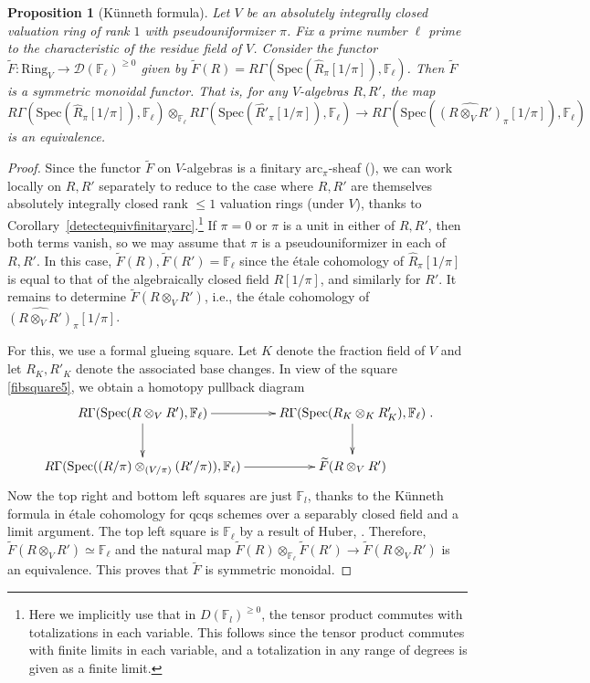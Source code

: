 \documentclass[reqno]{amsart}
\newcommand{\spec}{\mathrm{Spec}}
\newcommand{\arc}{\mathrm{arc}}
\newcommand{\D}{\mathcal{D}}
\newtheorem{proposition}[theorem]{Proposition}
\theoremstyle{definition}
\begin{document}
\begin{proposition}[K\"unneth formula] 
\label{kunnethformula}
Let $V$ be an absolutely integrally closed valuation ring of rank $1$ with
pseudouniformizer $\pi$. Fix a prime number $\ell$ prime to the characteristic of
the residue field of $V$. Consider the functor $\widetilde{F}\colon 
\mathrm{Ring}_V \to \D( \mathbb{F}_\ell)^{\geq 0}$ given by $\widetilde{F}(R) = R
\Gamma( \spec( \hat{R}_\pi[1/\pi]), \mathbb{F}_\ell)$. 
Then $\widetilde{F}$ is a symmetric monoidal functor. That is, for any
$V$-algebras $R, R'$, the map
\[  R
\Gamma( \spec( \hat{R}_\pi[1/\pi]), \mathbb{F}_\ell) 
\otimes_{\mathbb{F}_\ell} R
\Gamma( \spec( \widehat{R'}_\pi[1/\pi]), \mathbb{F}_\ell)
\to 
R \Gamma( \spec( \widehat{(R\otimes_V R')}_\pi[1/\pi]), \mathbb{F}_\ell) 
\]
is an equivalence. 
\end{proposition} 
\begin{proof} 
Since the functor $\widetilde{F}$ on $V$-algebras is a finitary
$\arc_\pi$-sheaf (), 
we can work locally on $R, R'$ separately to reduce to the case where $R,
R'$ are themselves absolutely integrally closed rank $\leq 1$ valuation rings
(under $V$), thanks to Corollary~\ref{detectequivfinitaryarc}.\footnote{Here we
implicitly use that in $D(\mathbb{F}_l)^{\geq 0}$, the tensor product commutes
with totalizations in each variable. This follows since the tensor product
commutes with finite limits in each variable, and a totalization in any range
of degrees is given as a finite limit.} 
If $\pi = 0$ or $\pi$ is a unit in either of $R, R'$, then both terms vanish, so we may assume that $\pi$ is a pseudouniformizer in
each of $R, R'$. 
In this case, $\widetilde{F}(R), \widetilde{F}(R') = \mathbb{F}_\ell$ since the
\'etale cohomology of $\hat{R}_\pi[1/\pi]$ is equal to that of the
algebraically closed field $R[1/\pi]$, and similarly for $R'$. 
It remains to determine $\widetilde{F}( R \otimes_V R')$, i.e., the \'etale cohomology of 
$\widehat{(R\otimes_V R')}_\pi[1/\pi]$. 


For this, we use a formal glueing square. Let $K$ denote the fraction field
of $V$ and let $R_K, R'_K$ denote the associated base changes.  
In view of the square \eqref{fibsquare5}, we obtain a homotopy pullback diagram
\[ \xymatrix{
R \Gamma( \spec( R \otimes_V R'), \mathbb{F}_\ell) \ar[d]  \ar[r] & 
R \Gamma( \spec (R_K \otimes_K R'_K), \mathbb{F}_\ell) \ar[d]  \\
R \Gamma( \spec( (R/\pi) \otimes_{(V/\pi)} (R'/\pi)), \mathbb{F}_\ell) \ar[r] &  
\widetilde{F}(R \otimes_V R')
}. \]
Now the top right and bottom left squares are just $\mathbb{F}_l$, thanks to
the K\"unneth formula in \'etale cohomology for qcqs schemes over a separably
closed field \cite[Cor.~1.11]{finitude} and a limit argument.  
The top left square is $\mathbb{F}_\ell$ by a result of Huber, \cite[Cor.~4.2.7]{HuberBook}. 
Therefore, $\widetilde{F}( R \otimes_V R') \simeq \mathbb{F}_\ell$ and the natural map 
$\widetilde{F}(R) \otimes_{\mathbb{F}_\ell} \widetilde{F}(R')\to \widetilde{F}(R
\otimes_V R')$ is an equivalence. 
This proves that $\widetilde{F}$ is symmetric monoidal. 
\end{proof} 
\end{document}
